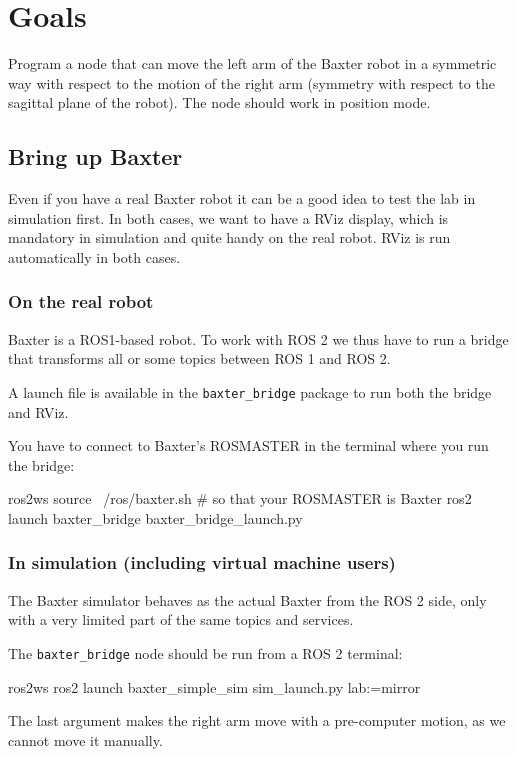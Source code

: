 \documentclass{ecnreport}
\author{O. Kermorgant}
\begin{document}


\section{Goals}

Program a node that can move the left arm of the Baxter robot in a symmetric way with respect to
the motion of the right arm (symmetry with respect to the sagittal plane of the robot).
The node should work in position mode. \\

\subsection{Bring up Baxter}

Even if you have a real Baxter robot it can be a good idea to test the lab in simulation first.
In both cases, we want to have a RViz display, which is mandatory in simulation and quite handy on the real robot. RViz is run automatically in both cases.

\subsubsection{On the real robot}

Baxter is a ROS1-based robot. To work with ROS 2 we thus have to run a bridge that transforms all or some topics between ROS 1 and ROS 2.

A launch file is available in the \texttt{baxter\_bridge} package to run both the bridge and RViz.

You have to connect to Baxter's ROSMASTER in the terminal where you run the bridge:
\begin{bashcodelarge}
 ros2ws
 source ~/ros/baxter.sh # so that your ROSMASTER is Baxter
 ros2 launch baxter_bridge baxter_bridge_launch.py
\end{bashcodelarge}

\subsubsection{In simulation (including virtual machine users)}

The Baxter simulator behaves as the actual Baxter from the ROS 2 side, only with a very limited part of the same topics and services. 

The \texttt{baxter\_bridge} node should be run from a ROS 2 terminal:
\begin{bashcodelarge}
ros2ws
ros2 launch baxter_simple_sim sim_launch.py lab:=mirror
\end{bashcodelarge}
The last argument makes the right arm move with a pre-computer motion, as we cannot move it manually.
\end{document}
